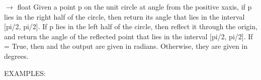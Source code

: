 \documentclass[a4paper,12ptopenany,oneside,english]{sphinxmanual}
\begin{document}
\begin{fulllineitems}
\label{\detokenize{utils:rhealpixdggs.utils.wrap_latitude}}
\pysigstartsignatures
\pysiglinewithargsret
{}
{\sphinxparamcomma {}}
{{ $\rightarrow$ float}}
\pysigstopsignatures
\sphinxAtStartPar
Given a point p on the unit circle at angle  from the positive x\sphinxhyphen{}axis,
if p lies in the right half of the circle, then return its angle that lies
in the interval {[}\sphinxhyphen{}pi/2, pi/2{]}.
If p lies in the left half of the circle, then reflect it through the
origin, and return the angle of the reflected point that lies in the
interval {[}\sphinxhyphen{}pi/2, pi/2{]}.
If  = True, then  and the output are given in radians.
Otherwise, they are given in degrees.

\sphinxAtStartPar
EXAMPLES:

\begin{sphinxVerbatim}[commandchars=\\\{\}]
 
 
 
 
 
 
\end{sphinxVerbatim}

\end{fulllineitems}
\end{document}
